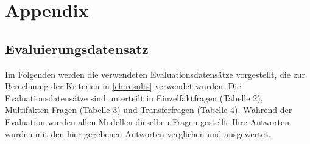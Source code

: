 \chapter*{Appendix}\label{ch:appendix}
\section*{Evaluierungsdatensatz}\label{app:evaldata}
Im Folgenden werden die verwendeten Evaluationsdatensätze vorgestellt, die zur Berechnung der Kriterien in \cref{ch:results} verwendet wurden.
Die Evaluationsdatensätze sind unterteilt in Einzelfaktfragen (Tabelle 2), Multifakten-Fragen (Tabelle 3) und Transferfragen (Tabelle 4).
Während der Evaluation wurden allen Modellen dieselben Fragen gestellt.
Ihre Antworten wurden mit den hier gegebenen Antworten verglichen und ausgewertet.
